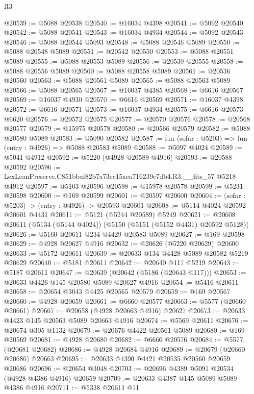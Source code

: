 \begin{lexlean}{R3}
\begin{coremodule}
@20539 := @5088 @20538
@20540 := @16034 @4398
@20541 := @5092 @20540
@20542 := @5088 @20541
@20543 := @16034 @4934
@20544 := @5092 @20543
@20546 := @5088 @20544 @5093
@20548 := @5088 @20546 @5089
@20550 := @5088 @20548 @5089
@20551 := @20542 @20550
@20553 := @5088 @20551 @5089
@20555 := @5088 @20553 @5089
@20556 := @20539 @20555
@20558 := @5088 @20556 @5089
@20560 := @5088 @20558 @5089
@20561 := @20536 @20560
@20563 := @5088 @20561 @5089
@20565 := @5088 @20563 @5089
@20566 := @5088 @20565
@20567 := @16037 @4385
@20568 := @6616 @20567
@20569 := @16037 @4930
@20570 := @6616 @20569
@20571 := @16037 @4398
@20572 := @6616 @20571
@20573 := @16037 @4934
@20575 := @6616 @20573 @6620
@20576 := @20572 @20575
@20577 := @20570 @20576
@20578 := @20568 @20577
@20579 := @15975 @20578
@20580 := @20566 @20579
@20582 := @5088 @20580 @5089
@20583 := @5090 @20582
@20587 := fun (sofar : @5203) => fun (entry : @4926) => @5088 @20583 @5089
@20588 := @5097 @4024
@20589 := @5041 @4912
@20592 := @5220 (@4928 @20589 @4916)
@20593 := @20588 @20592
@20596 := LexLeanPreserve.C851bbaf82b7a73cc15aea716239c7db4.R3.__fits_57 @5218 @4912
@20597 := @5103 @20596
@20598 := @15978 @20578
@20599 := @5231 @20598
@20600 := @169 @20599
@20601 := @20597 @20600
@20604 := (sofar : @5203) -> (entry : @4926) -> @20593 @20601
@20608 := @5114 @4024 @20592 @20601 @4431
@20611 := @5121 (@5244 @20589) @5249
@20621 := @20608 @20611 (@5134 (@5144 @4024)) (@5150 (@5151 (@5152 @4431) @20592 @5128))
@20626 := @5160 @20611 @234 @4429 @20583 @5089
@20627 := @169 @20598
@20629 := @4928 @20627 @4916
@20632 := @20626 (@5220 @20629) @20600
@20633 := @5172 @20611
@20639 := @20633 @134 @4428 @5089 @20582 @5219 @20629
@20640 := @5181 @20611
@20642 := @20640 @117 @5219
@20643 := @5187 @20611
@20647 := @20639 (@20642 (@5186 (@20643 @117)))
@20653 := @20633 @4426 @145 @20580 @5089 @20627 @4916
@20654 := @5416 @20611
@20658 := @20654 @3043 @4425 @20565 @20579
@20659 := @169 @20567
@20660 := @4928 @20659
@20661 := @6660 @20577
@20663 := @5577 (@20660 @20661)
@20667 := @20658 (@4928 @20663 @4916) @20627
@20673 := @20633 @4423 @145 @20563 @5089 @20663 @4916
@20674 := @5569 @20611
@20676 := @20674 @305 @1132
@20679 := @20676 @4422 @20561 @5089
@20680 := @169 @20569
@20681 := @4928 @20680
@20682 := @6660 @20576
@20684 := @5577 (@20681 @20682)
@20686 := @4928 @20684 @4916
@20689 := @20679 (@20660 @20686) @20663
@20695 := @20633 @4390 @4421 @20535 @20560 @20659 @20686
@20696 := @20654 @3048
@20703 := @20696 @4389 @5091 @20534 (@4928 @4386 @4916) @20659
@20709 := @20633 @4387 @145 @5089 @5089 @4386 @4916
@20711 := @5338 @20611 @11

\end{coremodule}
\end{lexlean}
